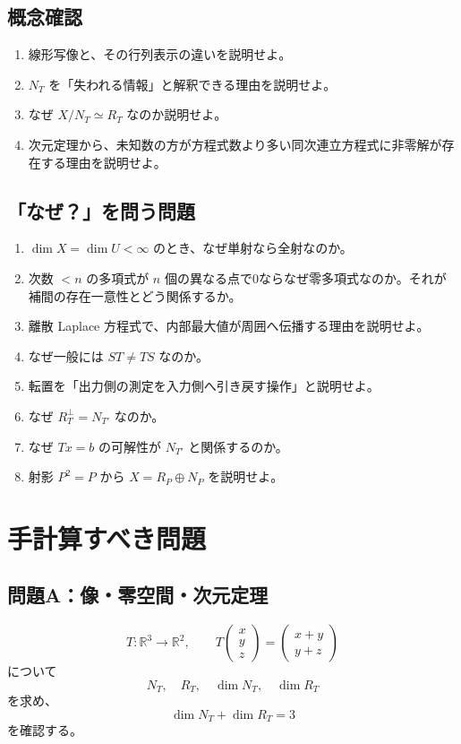 \documentclass[a4paper,11pt]{ltjsarticle}
\newcommand{\R}{\mathbb{R}}
\begin{document}
\subsection*{概念確認}
\begin{enumerate}
  \item 線形写像と、その行列表示の違いを説明せよ。
  \item $N_T$ を「失われる情報」と解釈できる理由を説明せよ。
  \item なぜ $X/N_T\simeq R_T$ なのか説明せよ。
  \item 次元定理から、未知数の方が方程式数より多い同次連立方程式に非零解が存在する理由を説明せよ。
\end{enumerate}

\subsection*{「なぜ？」を問う問題}
\begin{enumerate}[resume]
  \item $\dim X=\dim U<\infty$ のとき、なぜ単射なら全射なのか。
  \item 次数 $<n$ の多項式が $n$ 個の異なる点で0ならなぜ零多項式なのか。それが補間の存在一意性とどう関係するか。
  \item 離散 Laplace 方程式で、内部最大値が周囲へ伝播する理由を説明せよ。
  \item なぜ一般には $ST\ne TS$ なのか。
  \item 転置を「出力側の測定を入力側へ引き戻す操作」と説明せよ。
  \item なぜ $R_T^\perp=N_{T'}$ なのか。
  \item なぜ $Tx=b$ の可解性が $N_{T'}$ と関係するのか。
  \item 射影 $P^2=P$ から $X=R_P\oplus N_P$ を説明せよ。
\end{enumerate}

\section{手計算すべき問題}

\subsection*{問題A：像・零空間・次元定理}
\[
T:\R^3\to\R^2,
\qquad
T\begin{pmatrix}x\\y\\z\end{pmatrix}
=
\begin{pmatrix}x+y\\y+z\end{pmatrix}
\]
について
\[
N_T,\quad R_T,\quad \dim N_T,\quad \dim R_T
\]
を求め、
\[
\dim N_T+\dim R_T=3
\]
を確認する。
\end{document}
